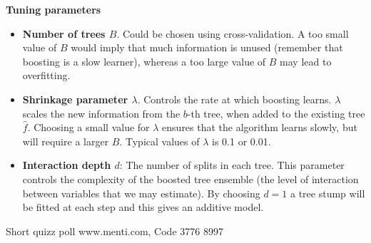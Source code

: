 \documentclass[
  10pt,
  ignorenonframetext,
]{beamer}
\begin{document}
\begin{frame}
\textbf{Tuning parameters}

\begin{itemize}
\item
  \textbf{Number of trees \(B\)}. Could be chosen using
  cross-validation. A too small value of \(B\) would imply that much
  information is unused (remember that boosting is a slow learner),
  whereas a too large value of \(B\) may lead to overfitting.
\item
  \textbf{Shrinkage parameter \(\lambda\)}. Controls the rate at which
  boosting learns. \(\lambda\) scales the new information from the
  \(b\)-th tree, when added to the existing tree \(\hat{f}\). Choosing a
  small value for \(\lambda\) ensures that the algorithm learns slowly,
  but will require a larger \(B\). Typical values of \(\lambda\) is 0.1
  or 0.01.
\item
  \textbf{Interaction depth \(d\)}: The number of splits in each tree.
  This parameter controls the complexity of the boosted tree ensemble
  (the level of interaction between variables that we may estimate). By
  choosing \(d=1\) a tree stump will be fitted at each step and this
  gives an additive model.
\end{itemize}
\end{frame}

\begin{frame}
\begin{block}{Short quizz poll}
\protect\hypertarget{short-quizz-poll}{}
www.menti.com, Code 3776 8997
\end{block}
\end{frame}
\end{document}
